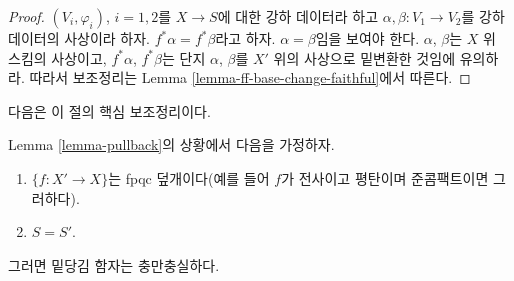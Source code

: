 \begin{proof}
$(V_i, \varphi_i)$, $i = 1, 2$를 $X \to S$에 대한 강하 데이터라
하고 $\alpha, \beta : V_1 \to V_2$를 강하 데이터의 사상이라 하자.
$f^*\alpha = f^*\beta$라고 하자. $\alpha = \beta$임을 보여야 한다.
$\alpha$, $\beta$는 $X$ 위 스킴의 사상이고, $f^*\alpha$,
$f^*\beta$는 단지 $\alpha$, $\beta$를 $X'$ 위의 사상으로 밑변환한
것임에 유의하라. 따라서 보조정리는 Lemma
\ref{lemma-ff-base-change-faithful}에서 따른다.
\end{proof}

\noindent
다음은 이 절의 핵심 보조정리이다.

\begin{lemma}
\label{lemma-fully-faithful}
Lemma \ref{lemma-pullback}의 상황에서 다음을 가정하자.
\begin{enumerate}
\item $\{f : X' \to X\}$는 fpqc 덮개이다(예를 들어 $f$가 전사이고
평탄이며 준콤팩트이면 그러하다).
\item $S = S'$.
\end{enumerate}
그러면 밑당김 함자는 충만충실하다.
\end{lemma}

